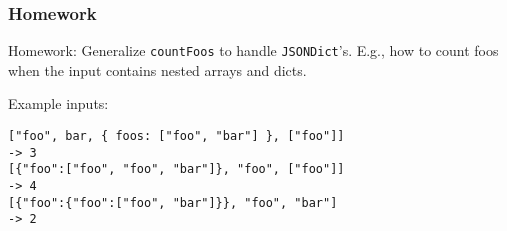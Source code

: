\documentclass{beamer}
\begin{document}
\begin{frame}[fragile]
\frametitle{Homework}

Homework: Generalize \verb+countFoos+ to handle \verb+JSONDict+'s.
E.g., how to count foos when the input contains nested arrays and
dicts.

\bigskip

Example inputs:

\begin{verbatim}
["foo", bar, { foos: ["foo", "bar"] }, ["foo"]]
-> 3
[{"foo":["foo", "foo", "bar"]}, "foo", ["foo"]]
-> 4
[{"foo":{"foo":["foo", "bar"]}}, "foo", "bar"]
-> 2
\end{verbatim}


\end{frame}


\end{document}
